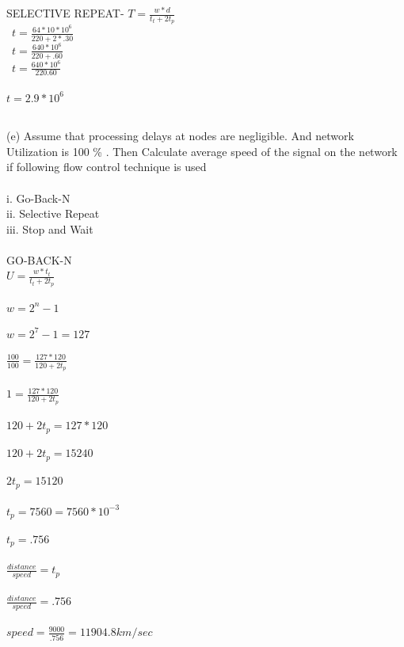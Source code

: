 \documentclass[a4paper,12pt]{article}
\begin{document}
SELECTIVE REPEAT-
$T=\frac{w*d}{t_{t}+2t_{p}}$\\\
$t=\frac{64*10*10^{6}}{220+2*.30}$\\\
$t=\frac{640*10^{6}}{220+.60}$\\\
$t=\frac{640*10^{6}}{220.60}$\\\\
$t=2.9*10^{6}$\\\

(e) Assume that processing delays at nodes are negligible. And network Utilization is
100 \% . Then Calculate average speed of the signal on the network if following flow
control technique is used\\\\
i. Go-Back-N\\
ii. Selective Repeat\\
iii. Stop and Wait\\\\
GO-BACK-N\\
$U=\frac{w*t_{t}}{t_{t}+2t_{p}}$\\\\
$w=2^{n}-1$\\\\
$w=2^{7}-1=127$\\\\
$\frac{100}{100}=\frac{127*120}{120+2t_{p}}$\\\\
$1=\frac{127*120}{120+2t_{p}}$\\\\
$120+2t_{p}=127*120$\\\\
$120+2t_{p}=15240$\\\\
$2t_{p}=15120$\\\\
$t_{p}=7560=7560*10^{-3}$\\\\
$t_{p}=.756$\\\\
$\frac{distance}{speed}=t_{p}$\\\\
$\frac{distance}{speed}=.756$\\\\
$speed=\frac{9000}{.756}=11904.8 km/sec$\\\\
\end{document}
